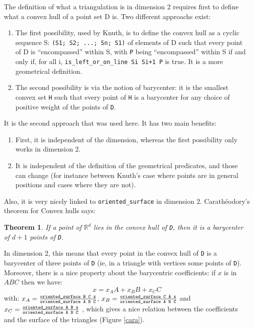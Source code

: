 \documentclass[a4paper,10pt]{article}
\newtheorem{theorem}{Theorem}
\begin{document}
The definition of what a triangulation is in dimension 2 requires first to define what a convex hull of a point set D is.
Two different approachs exist:
\begin{enumerate}
\item The first possibility, used by Knuth,  is to define the convex hull as a cyclic sequence S: {\tt (S1; S2; ...; Sn; S1)} of elements of D such that every point of D is ``encompassed'' within S, with {\tt P} being ``encompassed'' within S if and only if, for all i,  {\tt is\_left\_or\_on\_line Si Si+1 P} is true.
  It is a more geometrical definition.
\item The second possibility is via the notion of barycenter: it is the smallest convex set {\tt H} such that every point of {\tt H} is a barycenter for any choice of positive weight of the points of {\tt D}.
\end{enumerate}

It is the second approach that was used here. It has two main benefits:
\begin{enumerate}
\item First, it is independent of the dimension, whereas the first possibility only works in dimension 2.
\item It is independent of the definition of the geometrical predicates, and those can change (for instance between Knuth's case where points are in general positions and cases where they are not). 
\end{enumerate}
Also, it is very nicely linked to {\tt oriented\_surface} in dimension 2. Carathéodory's theorem for Convex hulls says:
\begin{theorem}
If a point of $\mathbb{R}^d$ lies in the convex hull of {\tt D}, then it is a barycenter of $d+1$ points of {\tt D}.
\end{theorem}
In dimension 2, this means that every point in the convex hull of {\tt D} is a barycenter of three points of {\tt D} (ie, in a triangle with vertices some points of {\tt D}).
Moreover, there is a nice property about the barycentric coefficients: if $x$ is in $ABC$ then we have:
$$x = x_AA + x_BB + x_CC$$
with: $x_A =\frac{ \text{\tt oriented\_surface B C x}}{\text{\tt oriented\_surface A B C}}$,
$x_B =\frac{ \text{\tt oriented\_surface C A x}}{\text{\tt oriented\_surface A B C}}$ and
$x_C =\frac{ \text{\tt oriented\_surface A B x}}{\text{\tt oriented\_surface A B C}}$
, which gives a nice relation between the coefficients and the surface of the triangles (Figure \ref{cara}).
\end{document}
